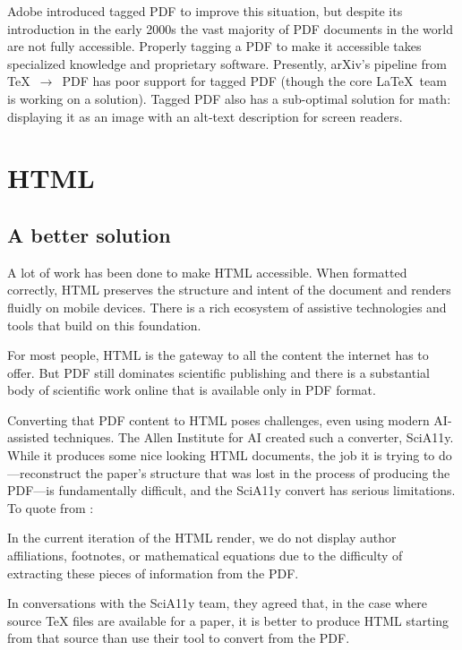 \documentclass{easychair}
\begin{document}
Adobe introduced tagged PDF to improve this situation, but despite its introduction in the early 2000s the vast majority of PDF documents in the world are not fully accessible. Properly tagging a PDF to make it accessible takes specialized knowledge and proprietary software. Presently, arXiv’s pipeline from \TeX~$\rightarrow$~PDF has poor support for tagged PDF (though the core \LaTeX\ team is working on a solution). Tagged PDF also has a sub-optimal solution for math: displaying it as an image with an alt-text description for screen readers.
\section{HTML}
\subsection{A better solution}
\label{sect:A better solution}

A lot of work has been done to make HTML accessible. When formatted correctly, HTML preserves the structure and intent of the document and renders fluidly on mobile devices. There is a rich ecosystem of assistive technologies and tools that build on this foundation. 

For most people, HTML is the gateway to all the content the internet has to offer. But PDF still dominates scientific publishing and there is a substantial body of scientific work online that is available only in PDF format.

Converting that PDF content to HTML poses challenges, even using modern AI-assisted techniques. The Allen Institute for AI created such a converter, SciA11y. While it produces some nice looking HTML documents, the job it is trying to do---reconstruct the paper's structure that was lost in the process of producing the PDF---is fundamentally difficult, and the SciA11y convert has serious limitations. To quote from \Textcite{wang2021improving}:
\begin{displayquote}
In the current iteration of the HTML render, we do not display author affiliations, footnotes, or mathematical equations due to the difficulty of extracting these pieces of information from the PDF.
\end{displayquote}
In conversations with the SciA11y team, they agreed that, in the case where source TeX files are available for a paper, it is better to produce HTML starting from that source than use their tool to convert from the PDF.
\end{document}
